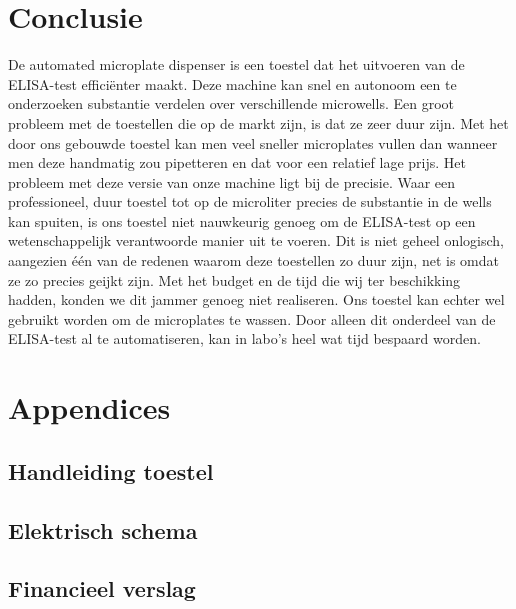 \documentclass[a4paper,twoside,kulak]{kulakreport} %
\begin{document}
\chapter{Conclusie}

De automated microplate dispenser is een toestel dat het uitvoeren van de ELISA-test  efficiënter maakt. Deze machine kan snel en autonoom een te onderzoeken substantie verdelen over verschillende microwells. Een groot probleem met de toestellen die op de markt zijn, is dat ze zeer duur zijn. Met het door ons gebouwde toestel kan men veel sneller microplates vullen dan wanneer men deze handmatig zou pipetteren en dat voor een relatief lage prijs. Het probleem met deze versie van onze machine ligt bij de precisie. Waar een professioneel, duur toestel tot op de microliter precies de substantie in de wells kan spuiten, is ons toestel niet nauwkeurig genoeg om de ELISA-test op een wetenschappelijk verantwoorde manier uit te voeren. Dit is niet geheel onlogisch, aangezien één van de redenen waarom deze toestellen zo duur zijn, net is omdat ze zo precies geijkt zijn. Met het budget en de tijd die wij ter beschikking hadden, konden we dit jammer genoeg niet realiseren. Ons toestel kan echter wel gebruikt worden om de microplates te wassen. Door alleen dit onderdeel van de ELISA-test al te automatiseren, kan in labo's heel wat tijd bespaard worden. 

\clearpage
\nocite{wikipedia,LabX}



\chapter*{Appendices}

\section*{Handleiding toestel}



\section*{Elektrisch schema}
\label{Appendix: elektrisch schema}


\section*{Financieel verslag}
\label{Appendix: Financieel verslag}
\end{document}
